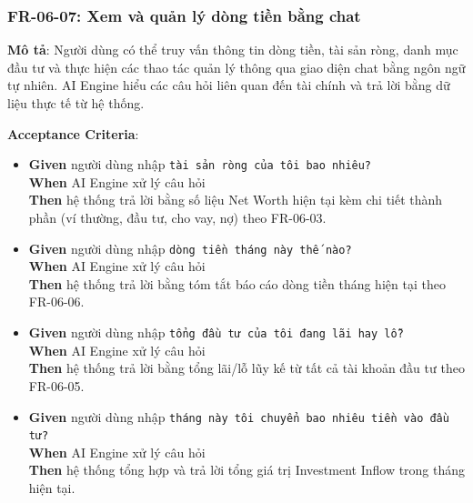 \subsubsection{FR-06-07: Xem và quản lý dòng tiền bằng chat}

\textbf{Mô tả}: Người dùng có thể truy vấn thông tin dòng tiền, tài sản ròng, danh mục đầu tư và thực hiện các thao tác quản lý thông qua giao diện chat bằng ngôn ngữ tự nhiên. AI Engine hiểu các câu hỏi liên quan đến tài chính và trả lời bằng dữ liệu thực tế từ hệ thống.



\textbf{Acceptance Criteria}:

\begin{itemize}
\item \textbf{Given} người dùng nhập \texttt{tài sản ròng của tôi bao nhiêu?}  \\ \hspace*{1.5em}  \textbf{When} AI Engine xử lý câu hỏi  \\ \hspace*{1.5em}  \textbf{Then} hệ thống trả lời bằng số liệu Net Worth hiện tại kèm chi tiết thành phần (ví thường, đầu tư, cho vay, nợ) theo FR-06-03.
\item \textbf{Given} người dùng nhập \texttt{dòng tiền tháng này thế nào?}  \\ \hspace*{1.5em}  \textbf{When} AI Engine xử lý câu hỏi  \\ \hspace*{1.5em}  \textbf{Then} hệ thống trả lời bằng tóm tắt báo cáo dòng tiền tháng hiện tại theo FR-06-06.
\item \textbf{Given} người dùng nhập \texttt{tổng đầu tư của tôi đang lãi hay lỗ?}  \\ \hspace*{1.5em}  \textbf{When} AI Engine xử lý câu hỏi  \\ \hspace*{1.5em}  \textbf{Then} hệ thống trả lời bằng tổng lãi/lỗ lũy kế từ tất cả tài khoản đầu tư theo FR-06-05.
\item \textbf{Given} người dùng nhập \texttt{tháng này tôi chuyển bao nhiêu tiền vào đầu tư?}  \\ \hspace*{1.5em}  \textbf{When} AI Engine xử lý câu hỏi  \\ \hspace*{1.5em}  \textbf{Then} hệ thống tổng hợp và trả lời tổng giá trị Investment Inflow trong tháng hiện tại.

\end{itemize}
